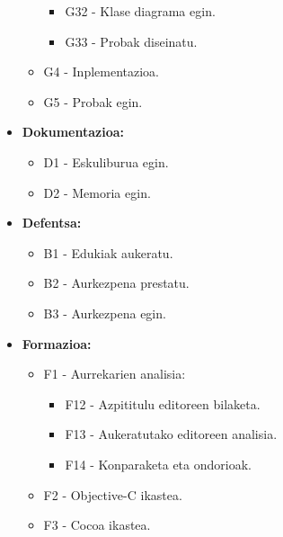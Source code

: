 \begin{itemize}
\begin{itemize}
\begin{itemize}
		\item G32 - Klase diagrama egin.
		\item G33 - Probak diseinatu.
		\end{itemize}
	\item G4 - Inplementazioa.
	\item G5 - Probak egin.
	\end{itemize}
\item \textbf{Dokumentazioa:}
	\begin{itemize}
	\item D1 - Eskuliburua egin.
	\item D2 - Memoria egin.
	\end{itemize}
\item \textbf{Defentsa:}
	\begin{itemize}
	\item B1 - Edukiak aukeratu.
	\item B2 - Aurkezpena prestatu.
	\item B3 - Aurkezpena egin.
	\end{itemize}
\item \textbf{Formazioa:}
	\begin{itemize}
	\item F1 - Aurrekarien analisia:
		\begin{itemize}
		\item F12 - Azpititulu editoreen bilaketa.
		\item F13 - Aukeratutako editoreen analisia.
		\item F14 - Konparaketa eta ondorioak.
		\end{itemize}
	\item F2 - Objective-C ikastea.
	\item F3 - Cocoa ikastea.
	\end{itemize}
\end{itemize}

